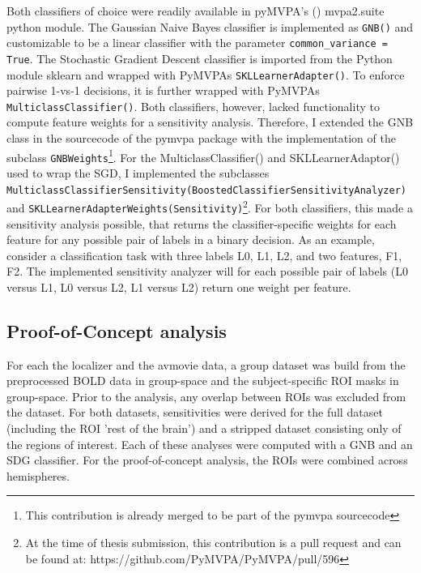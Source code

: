 \documentclass[a4paper, 12pt]{scrreprt}
\begin{document}
Both classifiers of choice were readily available in pyMVPA’s (\cite{hanke2009pymvpa}) mvpa2.suite python module. The Gaussian Naive Bayes classifier is implemented as \texttt{GNB()} and customizable to be a linear classifier with the parameter \texttt{common\_variance = True}. The Stochastic Gradient Descent classifier is imported from the Python module sklearn and wrapped with PyMVPAs \texttt{SKLLearnerAdapter()}. To enforce pairwise 1-vs-1 decisions, it is further wrapped with PyMVPAs \texttt{MulticlassClassifier()}. \newline
Both classifiers, however, lacked functionality to compute feature weights for a sensitivity analysis. Therefore, I extended the GNB class in the sourcecode of the pymvpa package with the implementation of the subclass \texttt{GNBWeights}\footnote{This contribution is already merged to be part of the pymvpa sourcecode}. For the MulticlassClassifier() and SKLLearnerAdaptor() used to wrap the SGD, I implemented the subclasses \newline \texttt{MulticlassClassifierSensitivity(BoostedClassifierSensitivityAnalyzer)} and  \texttt{SKLLearnerAdapterWeights(Sensitivity)}\footnote{At the time of thesis submission, this contribution is a pull request and can be found at: https://github.com/PyMVPA/PyMVPA/pull/596}. For both classifiers, this made a sensitivity analysis possible, that returns the classifier-specific weights for each feature for any possible pair of labels in a binary decision. As an example, consider a classification task with three labels L0, L1, L2, and two features, F1, F2. The implemented sensitivity analyzer will for each possible pair of labels (L0 versus L1, L0 versus L2, L1 versus L2) return one weight per feature. 

\subsection{Proof-of-Concept analysis}

For each the localizer and the avmovie data, a group dataset was build from the preprocessed BOLD data in group-space and the subject-specific ROI masks in group-space. Prior to the analysis, any overlap between ROIs was excluded from the dataset.
For both datasets, sensitivities were derived for the full dataset (including the ROI 'rest of the brain') and a stripped dataset consisting only of the regions of interest. Each of these analyses were computed with a GNB and an SDG classifier. For the proof-of-concept analysis, the ROIs were combined across hemispheres.
\end{document}
